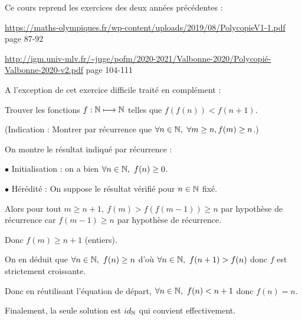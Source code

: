 \author{Matthieu Bouyer}
Ce cours reprend les exercices des deux années précédentes :

\url{https://maths-olympiques.fr/wp-content/uploads/2019/08/PolycopieV1-1.pdf}
page 87-92

\url{http://igm.univ-mlv.fr/~juge/pofm/2020-2021/Valbonne-2020/Polycopié-Valbonne-2020-v2.pdf}
page 104-111

A l'exception de cet exercice difficile traité en complément :

\begin{exo}
Trouver les fonctions $f:\mathbb N\longmapsto\mathbb N$ telles que $f(f(n))<f(n+1)$.

(Indication : Montrer par récurrence que $\forall n\in\mathbb N,~\forall m\ge n, f(m)\ge n$.)
\end{exo}

\begin{sol}
On montre le résultat indiqué par récurrence :

$\bullet$ Initialisation : on a bien $\forall n\in\mathbb N,~f(n)\ge0$.

$\bullet$ Hérédité : On suppose le résultat vérifié pour $n\in\mathbb N$ fixé.

Alors pour tout $m\ge n+1,~f(m)>f(f(m-1))\ge n$ par hypothèse de récurrence car $f(m-1)\ge n$ par hypothèse de récurrence.

Donc $f(m)\ge n+1$ (entiers).

\bigskip

On en déduit que $\forall n\in\mathbb N,~f(n)\ge n$ d'où $\forall n\in\mathbb N,~f(n+1)>f(n)$ donc $f$ est strictement croissante.

Donc en réutilisant l'équation de départ, $\forall n\in\mathbb N,~f(n)<n+1$ donc $f(n)=n$.

Finalement, la seule solution est $id_\mathbb N$ qui convient effectivement.
\end{sol}

